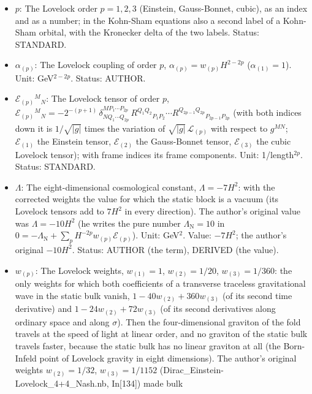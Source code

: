 \documentclass[
  10pt,
]{article}
\providecommand{\tightlist}{%
  \setlength{\itemsep}{0pt}\setlength{\parskip}{0pt}}
\begin{document}
\begin{itemize}
\tightlist
\item
  \(p\): The Lovelock order \(p = 1, 2, 3\) (Einstein, Gauss-Bonnet,
  cubic), as an index and as a number; in the Kohn-Sham equations also a
  second label of a Kohn-Sham orbital, with the Kronecker delta of the
  two labels. Status: STANDARD.
\item
  \(\alpha_{(p)}\): The Lovelock coupling of order \(p\),
  \(\alpha_{(p)} = w_{(p)}H^{2-2p}\) (\(\alpha_{(1)} = 1\)). Unit:
  GeV\(^{2-2p}\). Status: AUTHOR.
\item
  \(\mathcal{E}_{(p)}{}^M{}_N\): The Lovelock tensor of order \(p\),
  \(\mathcal{E}_{(p)}{}^M{}_N = -2^{-(p+1)}\,\delta^{MP_1\cdots P_{2p}}_{NQ_1\cdots Q_{2p}}\,R^{Q_1Q_2}{}_{P_1P_2}\cdots R^{Q_{2p-1}Q_{2p}}{}_{P_{2p-1}P_{2p}}\)
  (with both indices down it is \(1/\sqrt{\lvert g\rvert}\) times the
  variation of \(\sqrt{\lvert g\rvert}\,\mathcal{L}_{(p)}\) with respect
  to \(g^{MN}\); \(\mathcal{E}_{(1)}\) the Einstein tensor,
  \(\mathcal{E}_{(2)}\) the Gauss-Bonnet tensor, \(\mathcal{E}_{(3)}\)
  the cubic Lovelock tensor); with frame indices its frame components.
  Unit: 1/length\(^{2p}\). Status: STANDARD.
\item
  \(\Lambda\): The eight-dimensional cosmological constant,
  \(\Lambda = -7H^2\): with the corrected weights the value for which
  the static block is a vacuum (its Lovelock tensors add to \(7H^2\) in
  every direction). The author's original value was \(\Lambda = -10H^2\)
  (he writes the pure number \(\Lambda_{\mathrm{N}} = 10\) in
  \(0 = -\Lambda_{\mathrm{N}} + \sum_p H^{-2p}w_{(p)}\mathcal{E}_{(p)}\)).
  Unit: GeV\(^2\). Value: \(-7H^2\); the author's original \(-10H^2\).
  Status: AUTHOR (the term), DERIVED (the value).
\item
  \(w_{(p)}\): The Lovelock weights, \(w_{(1)} = 1\),
  \(w_{(2)} = 1/20\), \(w_{(3)} = 1/360\): the only weights for which
  both coefficients of a transverse traceless gravitational wave in the
  static bulk vanish, \(1 - 40w_{(2)} + 360w_{(3)}\) (of its second time
  derivative) and \(1 - 24w_{(2)} + 72w_{(3)}\) (of its second
  derivatives along ordinary space and along \(\sigma\)). Then the
  four-dimensional graviton of the fold travels at the speed of light at
  linear order, and no graviton of the static bulk travels faster,
  because the static bulk has no linear graviton at all (the Born-Infeld
  point of Lovelock gravity in eight dimensions). The author's original
  weights \(w_{(2)} = 1/32\), \(w_{(3)} = 1/1152\)
  (Dirac\_Einstein-Lovelock\_4+4\_Nash.nb, In{[}134{]}) made bulk

\end{itemize}
\end{document}
